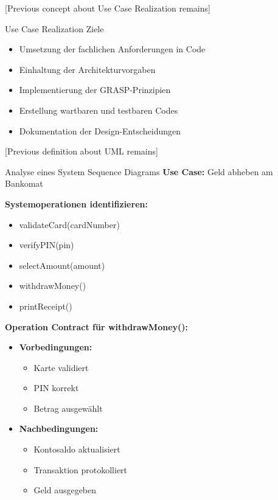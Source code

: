 [Previous concept about Use Case Realization remains]

\begin{theorem}{Use Case Realization Ziele}
\begin{itemize}
    \item Umsetzung der fachlichen Anforderungen in Code
    \item Einhaltung der Architekturvorgaben
    \item Implementierung der GRASP-Prinzipien
    \item Erstellung wartbaren und testbaren Codes
    \item Dokumentation der Design-Entscheidungen
\end{itemize}
\end{theorem}

[Previous definition about UML remains]

\begin{example}{Analyse eines System Sequence Diagrams}
\textbf{Use Case:} Geld abheben am Bankomat

\textbf{Systemoperationen identifizieren:}
\begin{itemize}
    \item validateCard(cardNumber)
    \item verifyPIN(pin)
    \item selectAmount(amount)
    \item withdrawMoney()
    \item printReceipt()
\end{itemize}

\textbf{Operation Contract für withdrawMoney():}
\begin{itemize}
    \item \textbf{Vorbedingungen:}
    \begin{itemize}
        \item Karte validiert
        \item PIN korrekt
        \item Betrag ausgewählt
    \end{itemize}
    \item \textbf{Nachbedingungen:}
    \begin{itemize}
        \item Kontosaldo aktualisiert
        \item Transaktion protokolliert
        \item Geld ausgegeben
    \end{itemize}
\end{itemize}
\end{example}

